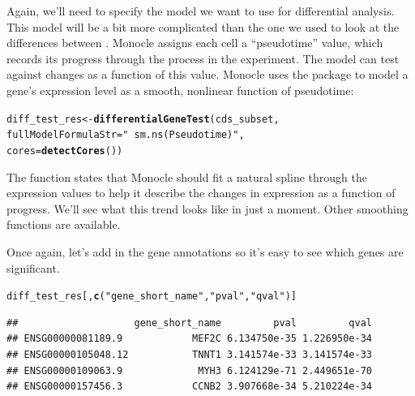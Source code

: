 \documentclass[10pt,oneside]{article}\usepackage[]{graphicx}\usepackage[]{color}
\makeatletter
\newcommand{\hlstr}[1]{\textcolor[rgb]{0.192,0.494,0.8}{#1}}%
\newcommand{\hlstd}[1]{\textcolor[rgb]{0.345,0.345,0.345}{#1}}%
\newcommand{\hlkwb}[1]{\textcolor[rgb]{0.69,0.353,0.396}{#1}}%
\newcommand{\hlkwc}[1]{\textcolor[rgb]{0.333,0.667,0.333}{#1}}%
\newcommand{\hlkwd}[1]{\textcolor[rgb]{0.737,0.353,0.396}{\textbf{#1}}}%
\newenvironment{kframe}{%
 \def\at@end@of@kframe{}%
 \ifinner\ifhmode%
  \def\at@end@of@kframe{\end{minipage}}%
  \begin{minipage}{\columnwidth}%
 \fi\fi%
 \def\FrameCommand##1{\hskip\@totalleftmargin \hskip-\fboxsep
 \colorbox{shadecolor}{##1}\hskip-\fboxsep
     \hskip-\linewidth \hskip-\@totalleftmargin \hskip\columnwidth}%
 \MakeFramed {\advance\hsize-\width
   \@totalleftmargin\z@ \linewidth\hsize
   \@setminipage}}%
 {\par\unskip\endMakeFramed%
 \at@end@of@kframe}
\newenvironment{knitrout}{}{} %
\makeatother
\begin{document}
Again, we'll need to specify the model we want to use for differential analysis.  This model will be a bit more complicated than the one we used to look at the differences between .  Monocle assigns each cell a ``pseudotime'' value, which records its progress through the process in the experiment.  The model can test against changes as a function of this value. Monocle uses the  package to model a gene's expression level as a smooth, nonlinear function of pseudotime:
\begin{knitrout}
\color{fgcolor}\begin{kframe}
\begin{alltt}
\hlstd{diff_test_res} \hlkwb{<-} \hlkwd{differentialGeneTest}\hlstd{(cds_subset,}
                                      \hlkwc{fullModelFormulaStr}\hlstd{=}\hlstr{"~sm.ns(Pseudotime)"}\hlstd{,}
                                      \hlkwc{cores} \hlstd{=} \hlkwd{detectCores}\hlstd{())}
\end{alltt}
\end{kframe}
\end{knitrout}

The  function states that Monocle should fit a natural spline through the expression values to help it describe the changes in expression as a function of progress. We'll see what this trend looks like in just a moment. Other smoothing functions are available.

Once again, let's add in the gene annotations so it's easy to see which genes are significant.
\begin{knitrout}
\color{fgcolor}\begin{kframe}
\begin{alltt}
\hlstd{diff_test_res[,}\hlkwd{c}\hlstd{(}\hlstr{"gene_short_name"}\hlstd{,} \hlstr{"pval"}\hlstd{,} \hlstr{"qval"}\hlstd{)]}
\end{alltt}
\begin{verbatim}
##                    gene_short_name         pval         qval
## ENSG00000081189.9            MEF2C 6.134750e-35 1.226950e-34
## ENSG00000105048.12           TNNT1 3.141574e-33 3.141574e-33
## ENSG00000109063.9             MYH3 6.124129e-71 2.449651e-70
## ENSG00000157456.3            CCNB2 3.907668e-34 5.210224e-34
\end{verbatim}
\end{kframe}
\end{knitrout}
\end{document}
